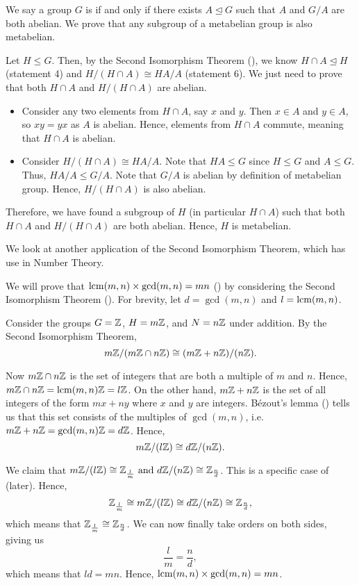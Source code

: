 \begin{example}
    We say a group $G$ is  if and only if there exists $A \unlhd G$ such that $A$ and $G/A$ are both abelian. We prove that any subgroup of a metabelian group is also metabelian.

    Let $H \leq G$. Then, by the Second Isomorphism Theorem (), we know $H \cap A \unlhd H$ (statement 4) and $H/(H \cap A) \cong HA / A$ (statement 6). We just need to prove that both $H \cap A$ and $H/(H \cap A)$ are abelian.
    \begin{itemize}
        \item Consider any two elements from $H \cap A$, say $x$ and $y$. Then $x \in A$ and $y \in A$, so $xy = yx$ as $A$ is abelian. Hence, elements from $H \cap A$ commute, meaning that $H \cap A$ is abelian.
        \item Consider $H/(H\cap A) \cong HA / A$. Note that $HA \leq G$ since $H \leq G$ and $A \leq G$. Thus, $HA / A \leq G / A$. Note that $G/A$ is abelian by definition of metabelian group. Hence, $H/(H \cap A)$ is also abelian.
    \end{itemize}
    Therefore, we have found a subgroup of $H$ (in particular $H \cap A$) such that both $H \cap A$ and $H/(H\cap A)$ are both abelian. Hence, $H$ is metabelian.
\end{example}

We look at another application of the Second Isomorphism Theorem, which has use in Number Theory.
\begin{example}
    We will prove that $\mathrm{lcm}(m,n)\times\gcd(m,n) = mn$ () by considering the Second Isomorphism Theorem (). For brevity, let $d = \gcd(m,n)$ and $l = \mathrm{lcm}(m,n)$.

    Consider the groups $G = \mathbb{Z}$, $H = m\mathbb{Z}$, and $N = n\mathbb{Z}$ under addition. By the Second Isomorphism Theorem,
    \[
        m\mathbb{Z}/(m\mathbb{Z} \cap n\mathbb{Z}) \cong (m\mathbb{Z} + n\mathbb{Z})/(n\mathbb{Z}).
    \]

    Now $m\mathbb{Z} \cap n\mathbb{Z}$ is the set of integers that are both a multiple of $m$ and $n$. Hence, $m\mathbb{Z} \cap n\mathbb{Z} = \mathrm{lcm}(m,n)\mathbb{Z} = l\mathbb{Z}$. On the other hand, $m\mathbb{Z} + n\mathbb{Z}$ is the set of all integers of the form $mx+ny$ where $x$ and $y$ are integers. B\'{e}zout's lemma () tells us that this set consists of the multiples of $\gcd(m,n)$, i.e. $m\mathbb{Z} + n\mathbb{Z} = \gcd(m,n)\mathbb{Z} = d\mathbb{Z}$. Hence,
    \[
        m\mathbb{Z}/(l\mathbb{Z}) \cong d\mathbb{Z}/(n\mathbb{Z}).
    \]

    We claim that $m\mathbb{Z} / (l\mathbb{Z}) \cong \mathbb{Z}_{\frac lm} \text{ and } d\mathbb{Z} / (n\mathbb{Z}) \cong \mathbb{Z}_{\frac nd}$. This is a specific case of  (later). Hence,
    \[
    \mathbb{Z}_{\frac lm} \cong m\mathbb{Z}/(l\mathbb{Z}) \cong d\mathbb{Z}/(n\mathbb{Z}) \cong \mathbb{Z}_{\frac nd},
    \]
    which means that $\mathbb{Z}_{\frac lm} \cong \mathbb{Z}_{\frac nd}$. We can now finally take orders on both sides, giving us
    \[
        \frac{l}{m} = \frac{n}{d},
    \]
    which means that $ld = mn$. Hence, $\mathrm{lcm}(m,n)\times\gcd(m,n) = mn$.
\end{example}


